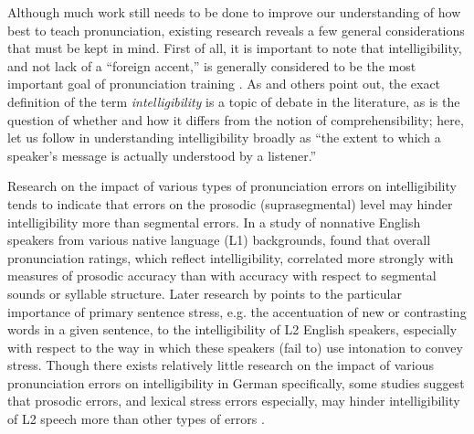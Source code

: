 
Although much work still needs to be done to improve our understanding of how best to teach pronunciation, existing research reveals a few general considerations that must be kept in mind.
	First of all, it is important to note that 
intelligibility, and not lack of a ``foreign accent,'' is generally considered to be the most important goal of pronunciation training \citep{Munro1999,Neri2002,Derwing2005,Field2005,Witt2012}. %
As \textcite{Field2005} and others point out, the exact definition of the term \textit{intelligibility} is a topic of debate in the literature, as is the question of whether and how it differs from the notion of comprehensibility; 
here, let us follow \textcite[p.~289]{Munro1999} in understanding intelligibility broadly as ``the extent to which a speaker’s message is actually understood by a listener.'' 
	

Research on the impact of various types of pronunciation errors on intelligibility tends to indicate that errors on the prosodic (suprasegmental) level may hinder intelligibility more than segmental errors.
% 
In a study of nonnative English speakers from various native language (L1) backgrounds, \textcite{Anderson-Hsieh1992} found that overall pronunciation ratings, which reflect intelligibility, correlated more strongly with measures of prosodic accuracy than with accuracy with respect to segmental sounds or syllable structure.
%
Later research by \textcite{Hahn2004} points to the particular importance of primary sentence stress, e.g. the accentuation of new or contrasting words in a given sentence, to the intelligibility of L2 English speakers, especially with respect to the way in which these speakers (fail to) use intonation to convey stress.
%
%
Though there exists relatively little research on the impact of various pronunciation errors on intelligibility in German specifically, some studies suggest that prosodic errors, and lexical stress errors especially, may hinder intelligibility of L2 speech more than other types of errors \citep{Hirschfeld1994,Hirschfeld2007}.



